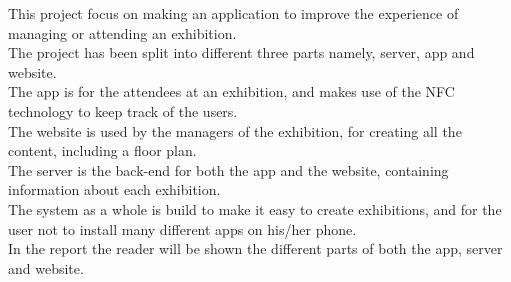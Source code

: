 This project focus on making an application to improve the experience of managing or attending an exhibition.\\
The project has been split into different three parts namely, server, app and website.\\
The app is for the attendees at an exhibition, and makes use of the NFC technology to keep track of the users.\\
The website is used by the managers of the exhibition, for creating all the content, including a floor plan.\\
The server is the back-end for both the app and the website, containing information about each exhibition.\\
The system as a whole is build to make it easy to create exhibitions, and for the user not to install many different apps on his/her phone.\\
In the report the reader will be shown the different parts of both the app, server and website.